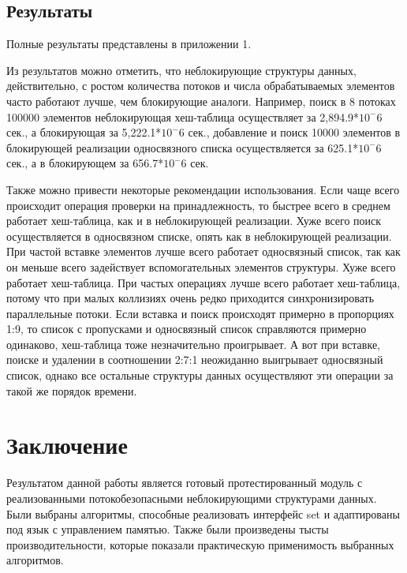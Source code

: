 \documentclass[12pt]{article}
\begin{document}
{				\subsection{Результаты}
					\par Полные результаты представлены в приложении 1.
					\par Из результатов можно отметить, что неблокирующие структуры данных, действительно, с ростом количества потоков и числа обрабатываемых элементов часто работают лучше, чем блокирующие аналоги. Например, поиск в 8 потоках 100000 элементов неблокирующая хеш-таблица осуществляет за 2,894.9*$10^-6$ сек., а блокирующая за 5,222.1*$10^-6$ сек., добавление и поиск 10000 элементов в блокирующей реализации односвязного списка осуществляется за 625.1*$10^-6$ сек., а в блокирующем за 656.7*$10^-6$ сек.
					\par Также можно привести некоторые рекомендации использования. Если чаще всего происходит операция проверки на принадлежность, то быстрее всего в среднем работает хеш-таблица, как и в неблокирующей реализации. Хуже всего поиск осуществляется в односвязном списке, опять как в неблокирующей реализации. При частой вставке элементов лучше всего работает односвязный список, так как он меньше всего задействует вспомогательных элементов структуры. Хуже всего работает хеш-таблица. При частых операциях лучше всего работает хеш-таблица, потому что при малых коллизиях очень редко приходится синхронизировать параллельные потоки. Если вставка и поиск происходят примерно в пропорциях 1:9, то список с пропусками и односвязный список справляются примерно одинаково, хеш-таблица тоже незначительно проигрывает. А вот при вставке, поиске и удалении в соотношении 2:7:1 неожиданно выигрывает односвязный список, однако все остальные структуры данных осуществляют эти операции за такой же порядок времени.				
				
		\newpage
		
		\section{Заключение}
			\par Результатом данной работы является готовый протестированный модуль с реализованными потокобезопасными неблокирующими структурами данных. Были выбраны алгоритмы, способные реализовать интерфейс set и адаптированы под язык с управлением памятью. Также были произведены тысты производительности, которые показали практическую применимость выбранных алгоритмов.
		
}
\end{document}
